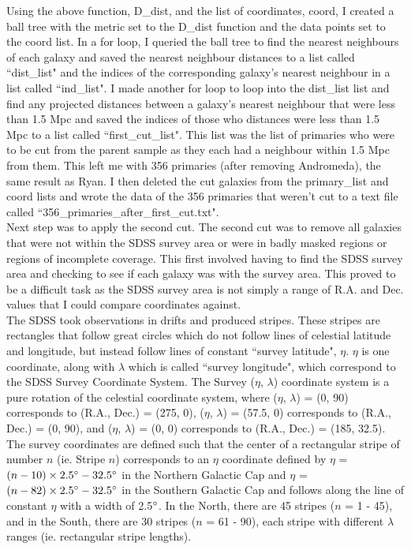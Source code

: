 \documentclass[10pt,letterpaper]{article}
\begin{document}
Using the above function, D\_dist, and the list of coordinates, coord, I created a ball tree with the metric set to the D\_dist function and the data points set to the coord list. In a for loop, I queried the ball tree to find the nearest neighbours of each galaxy and saved the nearest neighbour distances to a list called ``dist\_list" and the indices of the corresponding galaxy's nearest neighbour in a list called ``ind\_list". I made another for loop to loop into the dist\_list list and find any projected distances between a galaxy's nearest neighbour that were less than 1.5 Mpc and saved the indices of those who distances were less than 1.5 Mpc to a list called ``first\_cut\_list". This list was the list of primaries who were to be cut from the parent sample as they each had a neighbour within 1.5 Mpc from them. This left me with 356 primaries (after removing Andromeda), the same result as Ryan. I then deleted the cut galaxies from the primary\_list and coord lists and wrote the data of the 356 primaries that weren't cut to a text file called ``356\_primaries\_after\_first\_cut.txt".\\

Next step was to apply the second cut. The second cut was to remove all galaxies that were not within the SDSS survey area or were in badly masked regions or regions of incomplete coverage. This first involved having to find the SDSS survey area and checking to see if each galaxy was with the survey area. This proved to be a difficult task as the SDSS survey area is not simply a range of R.A. and Dec. values that I could compare coordinates against.\\

The SDSS took observations in drifts and produced stripes. These stripes are rectangles that follow great circles which do not follow lines of celestial latitude and longitude, but instead follow lines of constant ``survey latitude", $\eta$. $\eta$ is one coordinate, along with $\lambda$ which is called ``survey longitude", which correspond to the SDSS Survey Coordinate System. The Survey ($\eta$, $\lambda$) coordinate system is a pure rotation of the celestial coordinate system, where ($\eta$, $\lambda$) = (0, 90) corresponds to (R.A., Dec.) = (275, 0), ($\eta$, $\lambda$) = (57.5, 0) corresponds to (R.A., Dec.) = (0, 90), and ($\eta$, $\lambda$) = (0, 0) corresponds to (R.A., Dec.) = (185, 32.5). The survey coordinates are defined such that the center of a rectangular stripe of number $n$ (ie. Stripe $n$) corresponds to an $\eta$ coordinate defined by $\eta$ = $(n - 10)\times2.5\degree - 32.5\degree$ in the Northern Galactic Cap and $\eta$ = $(n - 82)\times 2.5\degree -32.5\degree$ in the Southern Galactic Cap and follows along the line of constant $\eta$ with a width of 2.5$\degree$. In the North, there are 45 stripes ($n$ = 1 - 45), and in the South, there are 30 stripes ($n$ = 61 - 90), each stripe with different $\lambda$ ranges (ie. rectangular stripe lengths). \cite{Survey Coordinates} \cite{Great Circle Drift Scanning}\\
\end{document}
